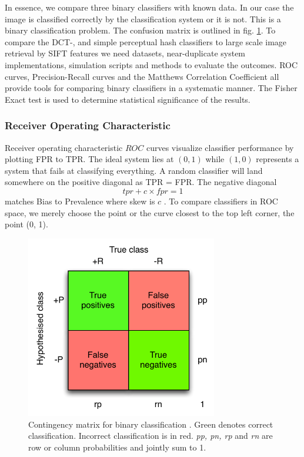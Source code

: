 \documentclass[english,12pt,a4paper,pdftex,elec,utf8, table]{aaltothesis}
\begin{document}
In essence, we compare three binary classifiers with known data. In our case the image is classified correctly by the classification system or it is not. This is a binary classification problem. The confusion matrix is outlined in fig. \ref{figconfusion}. To compare the DCT-, and simple perceptual hash classifiers to large scale image retrieval by SIFT features we need datasets, near-duplicate system implementations, simulation scripts and methods to evaluate the outcomes. ROC curves, Precision-Recall curves and the Matthews Correlation Coefficient all provide tools for comparing binary classifiers in a systematic manner. The Fisher Exact test is used to determine statistical significance of the results.

\subsubsection{Receiver Operating Characteristic}\label{ROCSection}
Receiver operating characteristic \(ROC\) curves visualize classifier performance by plotting FPR to TPR. The ideal system lies at $(0, 1)$ while $(1, 0)$ represents a system that fails at classifying everything. A random classifier will land somewhere on the positive diagonal as TPR = FPR. The negative diagonal
\begin{equation}\label{biastoprevalence}
tpr + c\times fpr=1
\end{equation}
matches Bias to Prevalence where skew is $c$ \cite{POWERS2011}. To compare classifiers in ROC space, we merely choose the point or the curve closest to the top left corner, the point (0, 1).

\begin{figure}[htb]
\begin{center}
\includegraphics[height=8cm]{figures/confusion}
\end{center}
\caption{Contingency matrix for binary classification \cite{Fawcett2006}. Green denotes correct classification. Incorrect classification is in red. \emph{pp, pn, rp} and \emph{rn} are row or column probabilities and jointly sum to 1.}
\label{figconfusion}
\end{figure}
\end{document}

